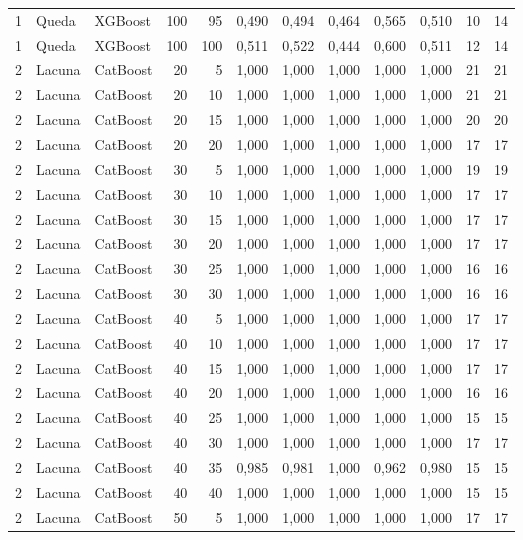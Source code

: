 \begin{longtable}{@{}rllrrrrrrrrr@{}}
1 & Queda & XGBoost & 100 & 95 & 0,490 & 0,494 & 0,464 & 0,565 & 0,510 & 10 & 14 \\
1 & Queda & XGBoost & 100 & 100 & 0,511 & 0,522 & 0,444 & 0,600 & 0,511 & 12 & 14 \\
2 & Lacuna & CatBoost & 20 & 5 & 1,000 & 1,000 & 1,000 & 1,000 & 1,000 & 21 & 21 \\
2 & Lacuna & CatBoost & 20 & 10 & 1,000 & 1,000 & 1,000 & 1,000 & 1,000 & 21 & 21 \\
2 & Lacuna & CatBoost & 20 & 15 & 1,000 & 1,000 & 1,000 & 1,000 & 1,000 & 20 & 20 \\
2 & Lacuna & CatBoost & 20 & 20 & 1,000 & 1,000 & 1,000 & 1,000 & 1,000 & 17 & 17 \\
2 & Lacuna & CatBoost & 30 & 5 & 1,000 & 1,000 & 1,000 & 1,000 & 1,000 & 19 & 19 \\
2 & Lacuna & CatBoost & 30 & 10 & 1,000 & 1,000 & 1,000 & 1,000 & 1,000 & 17 & 17 \\
2 & Lacuna & CatBoost & 30 & 15 & 1,000 & 1,000 & 1,000 & 1,000 & 1,000 & 17 & 17 \\
2 & Lacuna & CatBoost & 30 & 20 & 1,000 & 1,000 & 1,000 & 1,000 & 1,000 & 17 & 17 \\
2 & Lacuna & CatBoost & 30 & 25 & 1,000 & 1,000 & 1,000 & 1,000 & 1,000 & 16 & 16 \\
2 & Lacuna & CatBoost & 30 & 30 & 1,000 & 1,000 & 1,000 & 1,000 & 1,000 & 16 & 16 \\
2 & Lacuna & CatBoost & 40 & 5 & 1,000 & 1,000 & 1,000 & 1,000 & 1,000 & 17 & 17 \\
2 & Lacuna & CatBoost & 40 & 10 & 1,000 & 1,000 & 1,000 & 1,000 & 1,000 & 17 & 17 \\
2 & Lacuna & CatBoost & 40 & 15 & 1,000 & 1,000 & 1,000 & 1,000 & 1,000 & 17 & 17 \\
2 & Lacuna & CatBoost & 40 & 20 & 1,000 & 1,000 & 1,000 & 1,000 & 1,000 & 16 & 16 \\
2 & Lacuna & CatBoost & 40 & 25 & 1,000 & 1,000 & 1,000 & 1,000 & 1,000 & 15 & 15 \\
2 & Lacuna & CatBoost & 40 & 30 & 1,000 & 1,000 & 1,000 & 1,000 & 1,000 & 17 & 17 \\
2 & Lacuna & CatBoost & 40 & 35 & 0,985 & 0,981 & 1,000 & 0,962 & 0,980 & 15 & 15 \\
2 & Lacuna & CatBoost & 40 & 40 & 1,000 & 1,000 & 1,000 & 1,000 & 1,000 & 15 & 15 \\
2 & Lacuna & CatBoost & 50 & 5 & 1,000 & 1,000 & 1,000 & 1,000 & 1,000 & 17 & 17 \\

\end{longtable}

